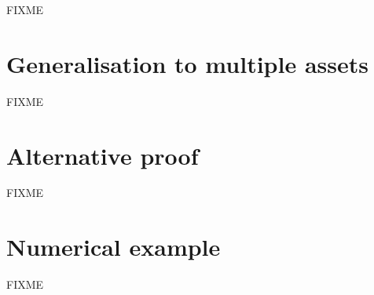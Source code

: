 \documentclass[a4paper]{article}
\begin{document}
FIXME

\section{Generalisation to multiple assets}


FIXME

\section{Alternative proof}


FIXME

\section{Numerical example}


FIXME

\pagebreak
\printbibliography
\end{document}

